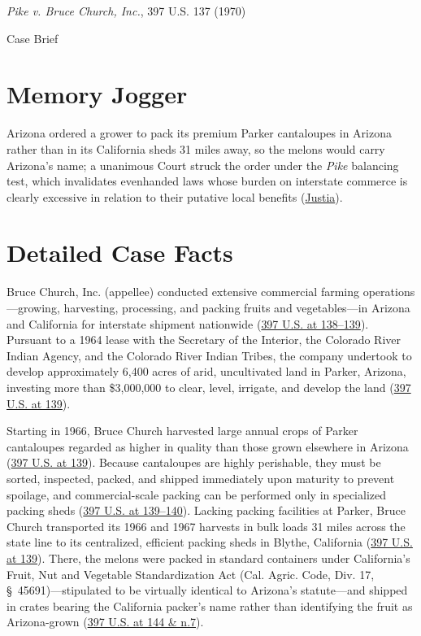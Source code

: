 \documentclass[12pt]{article}
\begin{document}
\begin{center}
{\LARGE \textit{Pike v. Bruce Church, Inc.}, 397 U.S. 137 (1970)\par}
\vspace{0.8em}
{\large Case Brief\par}
\end{center}
\vspace{1em}

\section{Memory Jogger}
Arizona ordered a grower to pack its premium Parker cantaloupes in Arizona rather than in its California sheds 31 miles away, so the melons would carry Arizona's name; a unanimous Court struck the order under the \textit{Pike} balancing test, which invalidates evenhanded laws whose burden on interstate commerce is clearly excessive in relation to their putative local benefits (\href{https://supreme.justia.com/cases/federal/us/397/137/}{Justia}).

\section{Detailed Case Facts}
Bruce Church, Inc. (appellee) conducted extensive commercial farming operations---growing, harvesting, processing, and packing fruits and vegetables---in Arizona and California for interstate shipment nationwide (\href{https://supreme.justia.com/cases/federal/us/397/137/}{397 U.S. at 138--139}). Pursuant to a 1964 lease with the Secretary of the Interior, the Colorado River Indian Agency, and the Colorado River Indian Tribes, the company undertook to develop approximately 6,400 acres of arid, uncultivated land in Parker, Arizona, investing more than \$3,000,000 to clear, level, irrigate, and develop the land (\href{https://supreme.justia.com/cases/federal/us/397/137/}{397 U.S. at 139}).

Starting in 1966, Bruce Church harvested large annual crops of Parker cantaloupes regarded as higher in quality than those grown elsewhere in Arizona (\href{https://supreme.justia.com/cases/federal/us/397/137/}{397 U.S. at 139}). Because cantaloupes are highly perishable, they must be sorted, inspected, packed, and shipped immediately upon maturity to prevent spoilage, and commercial-scale packing can be performed only in specialized packing sheds (\href{https://supreme.justia.com/cases/federal/us/397/137/}{397 U.S. at 139--140}). Lacking packing facilities at Parker, Bruce Church transported its 1966 and 1967 harvests in bulk loads 31 miles across the state line to its centralized, efficient packing sheds in Blythe, California (\href{https://supreme.justia.com/cases/federal/us/397/137/}{397 U.S. at 139}). There, the melons were packed in standard containers under California's Fruit, Nut and Vegetable Standardization Act (Cal. Agric. Code, Div. 17, \S~45691)---stipulated to be virtually identical to Arizona's statute---and shipped in crates bearing the California packer's name rather than identifying the fruit as Arizona-grown (\href{https://supreme.justia.com/cases/federal/us/397/137/}{397 U.S. at 144 \& n.7}).
\end{document}
